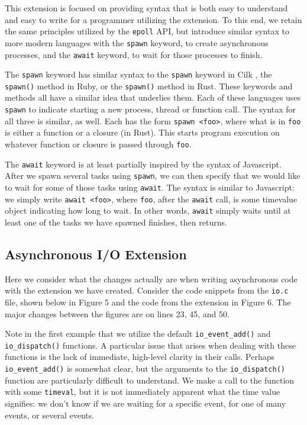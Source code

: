\documentclass[main.tex]{subfiles}
\begin{document}
This extension is focused on providing syntax that is both easy to understand and easy to write 
for a programmer utilizing the extension. To this end, we retain the same principles utilized by the 
\verb|epoll| API, but introduce similar syntax to more modern languages with the \verb|spawn| keyword, 
to create asynchronous processes, and the \verb|await| keyword, to wait for those processes to finish.

The \verb|spawn| keyword has similar syntax to the \verb|spawn| keyword in Cilk \cite{2}, the \verb|spawn()| method in
Ruby, or the \verb|spawn()| method in Rust. These keywords and methods all have a similar idea that underlies them. Each of
these languages uses \verb|spawn| to indicate starting a new process, thread or function call. The syntax for all three is
similar, as well. Each has the form \verb|spawn <foo>|, where what is in \verb|foo| is either a function or
a closure (in Rust). This starts program execution on whatever function or closure is passed through \verb|foo|.

The \verb|await| keyword is at least partially inspired by the syntax of Javascript. After we spawn several tasks using
\verb|spawn|, we can then specify that we would like to wait for some of those tasks using \verb|await|. The syntax is similar to
Javascript: we simply write \verb|await <foo>|, where \verb|foo|, after the \verb|await| call, is some timevalue object indicating how 
long to wait. In other words, \verb|await| simply waits until at least one of the tasks we have spawned
finishes, then returns.

\subsection{Asynchronous I/O Extension}
Here we consider what the changes actually are when writing asynchronous code with the extension we have created. 
Consider the code snippets from the \verb|io.c| file, shown below in Figure 5 and the code from the extension in Figure 
6. The major changes between the figures are on lines 23, 45, and 50.

Note in the first example that we utilize the default \verb|io_event_add()| and \verb|io_dispatch()| functions. A particular
issue that arises when dealing with these functions is the lack of immediate, high-level clarity in their calls. Perhaps 
\verb|io_event_add()| is somewhat clear, but the arguments to the \verb|io_dispatch()| function are particularly difficult
to understand. We make a call to the function with some \verb|timeval|, but it is not immediately apparent what the time value
signifies: we don't know if we are waiting for a specific event, for one of many events, or several events.  
\end{document}
